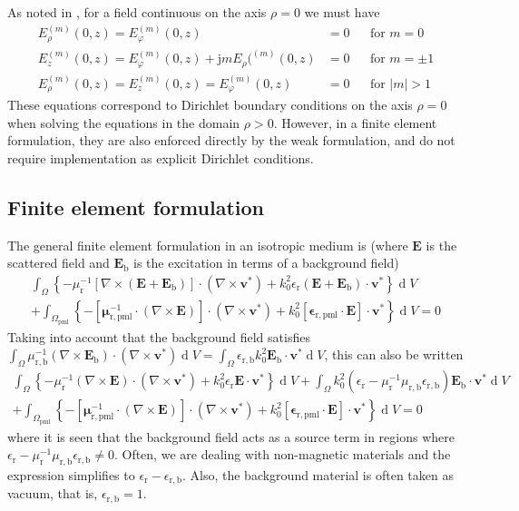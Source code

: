 \documentclass[a4paper,12pt]{article}
\renewcommand{\vec}[1]{\boldsymbol{#1}}
\newcommand{\mrm}[1]{\mathrm{#1}}
\newcommand{\diff}{\operatorname{d}\!}
\newcommand{\ju}{\mrm{j}}
\newcommand{\Ev}{\vec{E}}
\newcommand{\vv}{\vec{v}}
\newcommand{\epsm}{\boldsymbol{\epsilon}}
\newcommand{\mum}{\boldsymbol{\mu}}
\begin{document}
As noted in \cite[p. 906]{vanBladel2007}, for a field continuous on
the axis $\rho=0$ we must have
\begin{align}
  E_{\rho}^{(m)}(0,z) = E_{\varphi}^{(m)}(0,z) &= 0 && \text{for $m = 0$} \label{eq:axialcond_a} \\
  E_{z}^{(m)}(0,z) = E_{\varphi}^{(m)}(0,z) + \ju m E_{\rho}(^{(m)}(0,z) &= 0 && \text{for $m = \pm 1$} \label{eq:axialcond_b} \\
  E_{\rho}^{(m)}(0,z) = E_{z}^{(m)}(0,z) = E_{\varphi}^{(m)}(0,z) &= 0 && \text{for $|m| > 1$} \label{eq:axialcond_c}
\end{align}
These equations correspond to Dirichlet boundary conditions on the
axis $\rho=0$ when solving the equations in the domain
$\rho>0$. However, in a finite element formulation, they are also
enforced directly by the weak formulation, and do not require
implementation as explicit Dirichlet conditions.


\subsection{Finite element formulation}

The general finite element formulation in an isotropic medium is
(where $\Ev$ is the scattered field and $\Ev_{\mrm{b}}$ is the
excitation in terms of a background field)
\begin{multline}
  \int_{\Omega} \left\{ - \mu_{\mrm{r}}^{-1}[\nabla\times(\Ev+\Ev_{\mrm{b}})]\cdot(\nabla\times\vv^{*}) + k_{0}^{2}\epsilon_{\mrm{r}} (\Ev+\Ev_{\mrm{b}})\cdot\vv^{*} \right\} \diff V \\
  + \int_{\Omega_{\mrm{pml}}} \left\{ -[\mum_{\mrm{r,pml}}^{-1}\cdot(\nabla\times\Ev)]\cdot(\nabla\times\vv^{*}) + k_{0}^{2}[\epsm_{\mrm{r,pml}}\cdot\Ev]\cdot\vv^{*} \right\} \diff V = 0
\end{multline}
Taking into account that the background field satisfies
$\int_{\Omega}\mu_{\mrm{r,b}}^{-1} (\nabla\times\Ev_{\mrm{b}}) \cdot
(\nabla\times\vv^{*}) \diff V = \int_{\Omega}
\epsilon_{\mrm{r,b}}k_{0}^{2}\Ev_{\mrm{b}}\cdot\vv^{*} \diff V$, this
can also be written
\begin{multline}
  \int_{\Omega} \left\{ - \mu_{\mrm{r}}^{-1}(\nabla\times\Ev)\cdot(\nabla\times\vv^{*}) + k_{0}^{2}\epsilon_{\mrm{r}}\Ev\cdot\vv^{*} \right\} \diff V + \int_{\Omega} k_{0}^{2} (\epsilon_{\mrm{r}}-\mu_{\mrm{r}}^{-1}\mu_{\mrm{r,b}}\epsilon_{\mrm{r,b}}) \Ev_{\mrm{b}}\cdot\vv^{*} \diff V \\
  + \int_{\Omega_{\mrm{pml}}} \left\{ -[\mum_{\mrm{r,pml}}^{-1}\cdot(\nabla\times\Ev)]\cdot(\nabla\times\vv^{*}) + k_{0}^{2} [\epsm_{\mrm{r,pml}}\cdot\Ev]\cdot\vv^{*} \right\} \diff V = 0
\end{multline}
where it is seen that the background field acts as a source term in
regions where
$\epsilon_{\mrm{r}}-\mu_{\mrm{r}}^{-1}\mu_{\mrm{r,b}}\epsilon_{\mrm{r,b}}
\neq 0$. Often, we are dealing with non-magnetic materials and the
expression simplifies to
$\epsilon_{\mrm{r}}-\epsilon_{\mrm{r,b}}$. Also, the background
material is often taken as vacuum, that is,
$\epsilon_{\mrm{r,b}} = 1$.
\end{document}
